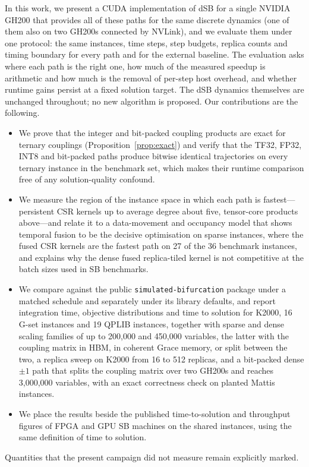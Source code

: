 \documentclass[11pt,a4paper]{article}
\newcommand{\code}[1]{\texttt{#1}}
\begin{document}
In this work, we present a CUDA implementation of dSB for a single NVIDIA GH200 that provides all of these paths for the same discrete dynamics (one of them also on two GH200s connected by NVLink), and we evaluate them under one protocol: the same instances, time steps, step budgets, replica counts and timing boundary for every path and for the external baseline. The evaluation asks where each path is the right one, how much of the measured speedup is arithmetic and how much is the removal of per-step host overhead, and whether runtime gains persist at a fixed solution target. The dSB dynamics themselves are unchanged throughout; no new algorithm is proposed. Our contributions are the following.
\begin{itemize}
\item We prove that the integer and bit-packed coupling products are exact for ternary couplings (Proposition~\ref{prop:exact}) and verify that the TF32, FP32, INT8 and bit-packed paths produce bitwise identical trajectories on every ternary instance in the benchmark set, which makes their runtime comparison free of any solution-quality confound.
\item We measure the region of the instance space in which each path is fastest---persistent CSR kernels up to average degree about five, tensor-core products above---and relate it to a data-movement and occupancy model that shows temporal fusion to be the decisive optimisation on sparse instances, where the fused CSR kernels are the fastest path on 27 of the 36 benchmark instances, and explains why the dense fused replica-tiled kernel is not competitive at the batch sizes used in SB benchmarks.
\item We compare against the public \code{simulated-bifurcation} package under a matched schedule and separately under its library defaults, and report integration time, objective distributions and time to solution for K2000, 16 G-set instances and 19 QPLIB instances, together with sparse and dense scaling families of up to 200,000 and 450,000 variables, the latter with the coupling matrix in HBM, in coherent Grace memory, or split between the two, a replica sweep on K2000 from 16 to 512 replicas, and a bit-packed dense $\pm1$ path that splits the coupling matrix over two GH200s and reaches 3,000,000 variables, with an exact correctness check on planted Mattis instances.
\item We place the results beside the published time-to-solution and throughput figures of FPGA and GPU SB machines on the shared instances, using the same definition of time to solution.
\end{itemize}
Quantities that the present campaign did not measure remain explicitly marked.
\end{document}
